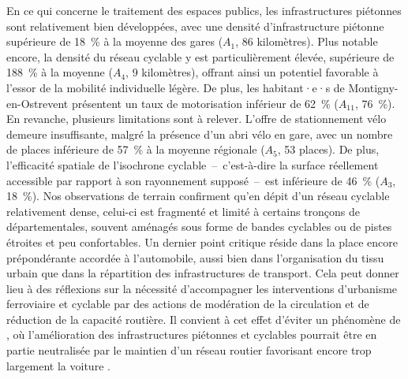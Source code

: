 \begin{refsegment}
En ce qui concerne le traitement des espaces publics, les infrastructures piétonnes sont relativement bien développées, avec une densité d'infrastructure piétonne supérieure de 18~\% à la moyenne des gares (\(A_{1}\), 86 kilomètres). Plus notable encore, la densité du réseau cyclable y est particulièrement élevée, supérieure de 188~\% à la moyenne (\(A_{4}\), 9 kilomètres), offrant ainsi un potentiel favorable à l'essor de la mobilité individuelle légère. De plus, les habitant·e·s de Montigny-en-Ostrevent présentent un taux de motorisation inférieur de 62~\% (\(A_{11}\), 76~\%). En revanche, plusieurs limitations sont à relever. L'offre de stationnement vélo demeure insuffisante, malgré la présence d'un abri vélo en gare, avec un nombre de places inférieure de 57~\% à la moyenne régionale (\(A_{5}\), 53 places). De plus, l'efficacité spatiale de l'isochrone cyclable~–~c'est-à-dire la surface réellement accessible par rapport à son rayonnement supposé~–~est inférieure de 46~\% (\(A_{3}\), 18~\%). Nos observations de terrain confirment qu'en dépit d'un réseau cyclable relativement dense, celui-ci est fragmenté et limité à certains tronçons de départementales, souvent aménagés sous forme de bandes cyclables ou de pistes étroites et peu confortables. Un dernier point critique réside dans la place encore prépondérante accordée à l'automobile, aussi bien dans l'organisation du tissu urbain que dans la répartition des infrastructures de transport. Cela peut donner lieu à des réflexions sur la nécessité d'accompagner les interventions d'urbanisme ferroviaire et cyclable par des actions de modération de la circulation et de réduction de la capacité routière. Il convient à cet effet d'éviter un phénomène de , où l'amélioration des infrastructures piétonnes et cyclables pourrait être en partie neutralisée par le maintien d'un réseau routier favorisant encore trop largement la voiture \textcolor{blue}{\autocite[259]{lo_feudo_scenario_2014}}.%


\end{refsegment}
